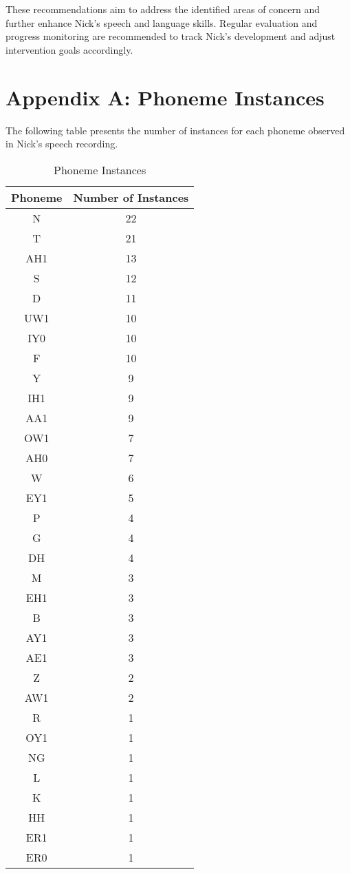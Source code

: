 \documentclass{article}
\begin{document}
These recommendations aim to address the identified areas of concern and further enhance Nick's speech and language skills. Regular evaluation and progress monitoring are recommended to track Nick's development and adjust intervention goals accordingly.

\vspace{2cm}

\section*{Appendix A: Phoneme Instances}

The following table presents the number of instances for each phoneme observed in Nick's speech recording.

\begin{table}[H]
\centering
\caption{Phoneme Instances}
\begin{tabular}{|c|c|}
\hline
\textbf{Phoneme} & \textbf{Number of Instances} \\ \hline
N & 22 \\ \hline
T & 21 \\ \hline
AH1 & 13 \\ \hline
S & 12 \\ \hline
D & 11 \\ \hline
UW1 & 10 \\ \hline
IY0 & 10 \\ \hline
F & 10 \\ \hline
Y & 9 \\ \hline
IH1 & 9 \\ \hline
AA1 & 9 \\ \hline
OW1 & 7 \\ \hline
AH0 & 7 \\ \hline
W & 6 \\ \hline
EY1 & 5 \\ \hline
P & 4 \\ \hline
G & 4 \\ \hline
DH & 4 \\ \hline
M & 3 \\ \hline
EH1 & 3 \\ \hline
B & 3 \\ \hline
AY1 & 3 \\ \hline
AE1 & 3 \\ \hline
Z & 2 \\ \hline
AW1 & 2 \\ \hline
R & 1 \\ \hline
OY1 & 1 \\ \hline
NG & 1 \\ \hline
L & 1 \\ \hline
K & 1 \\ \hline
HH & 1 \\ \hline
ER1 & 1 \\ \hline
ER0 & 1 \\ \hline
\end{tabular}
\end{table}
\end{document}
